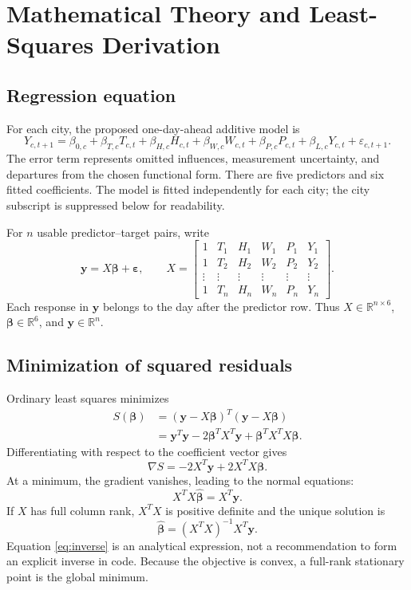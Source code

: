 \documentclass[11pt,a4paper]{article}
\newcommand{\R}{\mathbb{R}}
\newcommand{\sectionpage}[1]{\clearpage\section{#1}}
\begin{document}
\sectionpage{Mathematical Theory and Least-Squares Derivation}
\subsection{Regression equation}
For each city, the proposed one-day-ahead additive model is
\begin{equation}\label{eq:model}
Y_{c,t+1}=\beta_{0,c}+\beta_{T,c}T_{c,t}+\beta_{H,c}H_{c,t}
+\beta_{W,c}W_{c,t}+\beta_{P,c}P_{c,t}+\beta_{L,c}Y_{c,t}+\varepsilon_{c,t+1}.
\end{equation}
The error term represents omitted influences, measurement uncertainty, and departures from the chosen functional form. There are five predictors and six fitted coefficients. The model is fitted independently for each city; the city subscript is suppressed below for readability.

For $n$ usable predictor--target pairs, write
\begin{equation}
\mathbf y=X\boldsymbol\beta+\boldsymbol\varepsilon,\qquad
X=\begin{bmatrix}
1&T_1&H_1&W_1&P_1&Y_1\\
1&T_2&H_2&W_2&P_2&Y_2\\
\vdots&\vdots&\vdots&\vdots&\vdots&\vdots\\
1&T_n&H_n&W_n&P_n&Y_n
\end{bmatrix}.
\end{equation}
Each response in $\mathbf y$ belongs to the day after the predictor row. Thus $X\in\R^{n\times6}$, $\boldsymbol\beta\in\R^6$, and $\mathbf y\in\R^n$.

\subsection{Minimization of squared residuals}
Ordinary least squares minimizes
\begin{align}
S(\boldsymbol\beta)&=(\mathbf y-X\boldsymbol\beta)^T(\mathbf y-X\boldsymbol\beta)\\
&=\mathbf y^T\mathbf y-2\boldsymbol\beta^TX^T\mathbf y+
\boldsymbol\beta^TX^TX\boldsymbol\beta.
\end{align}
Differentiating with respect to the coefficient vector gives
\begin{equation}
\nabla S=-2X^T\mathbf y+2X^TX\boldsymbol\beta.
\end{equation}
At a minimum, the gradient vanishes, leading to the normal equations:
\begin{equation}\label{eq:normal}
X^TX\widehat{\boldsymbol\beta}=X^T\mathbf y.
\end{equation}
If $X$ has full column rank, $X^TX$ is positive definite and the unique solution is
\begin{equation}\label{eq:inverse}
\widehat{\boldsymbol\beta}=(X^TX)^{-1}X^T\mathbf y.
\end{equation}
Equation \eqref{eq:inverse} is an analytical expression, not a recommendation to form an explicit inverse in code. Because the objective is convex, a full-rank stationary point is the global minimum.
\end{document}

